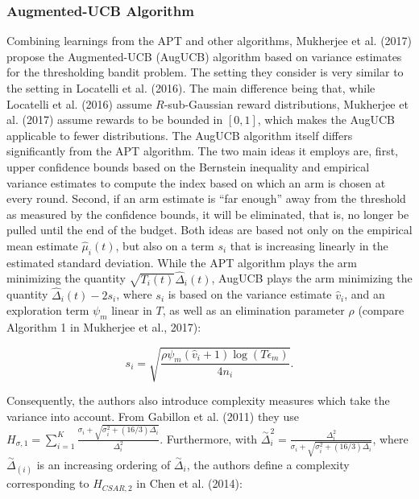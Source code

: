 \documentclass[11pt,]{article}
\begin{document}
\subsubsection{\texorpdfstring{Augmented-UCB Algorithm
\label{sec:AugUCBAlgorithm}}{Augmented-UCB Algorithm }}\label{augmented-ucb-algorithm}

Combining learnings from the APT and other algorithms, Mukherjee et al.
(2017) propose the Augmented-UCB (AugUCB) algorithm based on variance
estimates for the thresholding bandit problem. The setting they consider
is very similar to the setting in Locatelli et al. (2016). The main
difference being that, while Locatelli et al. (2016) assume
\(R\)-sub-Gaussian reward distributions, Mukherjee et al. (2017) assume
rewards to be bounded in \([0,1]\), which makes the AugUCB applicable to
fewer distributions. The AugUCB algorithm itself differs significantly
from the APT algorithm. The two main ideas it employs are, first, upper
confidence bounds based on the Bernstein inequality and empirical
variance estimates to compute the index based on which an arm is chosen
at every round. Second, if an arm estimate is ``far enough'' away from
the threshold as measured by the confidence bounds, it will be
eliminated, that is, no longer be pulled until the end of the budget.
Both ideas are based not only on the empirical mean estimate
\(\hat{\mu}_i(t)\), but also on a term \(s_i\) that is increasing
linearly in the estimated standard deviation. While the APT algorithm
plays the arm minimizing the quantity
\(\sqrt{T_i(t)} \hat{\Delta}_i(t)\), AugUCB plays the arm minimizing the
quantity \(\hat{\Delta}_i(t) - 2s_i\), where \(s_i\) is based on the
variance estimate \(\hat{v}_i\), and an exploration term \(\psi_m\)
linear in \(T\), as well as an elimination parameter \(\rho\) (compare
Algorithm 1 in Mukherjee et al., 2017):

\begin{equation*}
s_i = \sqrt{\frac{\rho \psi_m (\hat{v}_i + 1) \log(T \epsilon_m)}{4n_i}}.
\end{equation*}

Consequently, the authors also introduce complexity measures which take
the variance into account. From Gabillon et al. (2011) they use
\(H_{\sigma, 1}= \sum_{i=1}^K \frac{\sigma_i + \sqrt{\sigma_i^2 + (16/3)\Delta_i}}{\Delta_i^2}\).
Furthermore, with
\(\stackrel{\sim}{\Delta}_i^2 = \frac{\Delta_i^2}{\sigma_i + \sqrt{\sigma_i^2 + (16/3)\Delta_i}}\),
where \(\stackrel{\sim}{\Delta}_{(i)}\) is an increasing ordering of
\(\stackrel{\sim}{\Delta}_i\), the authors define a complexity
corresponding to \(H_{CSAR,2}\) in Chen et al. (2014):
\end{document}
